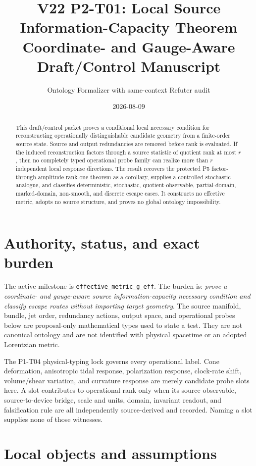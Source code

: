 \documentclass[11pt]{article}
\title{V22 P2-T01: Local Source Information-Capacity Theorem\\
\large Coordinate- and Gauge-Aware Draft/Control Manuscript}
\author{Ontology Formalizer with same-context Refuter audit}
\date{2026-08-09}
\begin{document}
\maketitle

\begin{abstract}
This draft/control packet proves a conditional local necessary condition for
reconstructing operationally distinguishable candidate geometry from a
finite-order source state.  Source and output redundancies are removed before
rank is evaluated.  If the induced reconstruction factors through a source
statistic of quotient rank at most \(r\), then no completely typed operational
probe family can realize more than \(r\) independent local response directions.
The result recovers the protected P5 factor-through-amplitude rank-one theorem
as a corollary, supplies a controlled stochastic analogue, and classifies
deterministic, stochastic, quotient-observable, partial-domain, marked-domain,
non-smooth, and discrete escape cases.  It constructs no effective metric,
adopts no source structure, and proves no global ontology impossibility.
\end{abstract}

\section{Authority, status, and exact burden}

The active milestone is \texttt{effective\_metric\_g\_eff}.  The burden is:
\emph{prove a coordinate- and gauge-aware source information-capacity necessary
condition and classify escape routes without importing target geometry}.
The source manifold, bundle, jet order, redundancy actions, output space, and
operational probes below are proposal-only mathematical types used to state a
test.  They are not canonical ontology and are not identified with physical
spacetime or an adopted Lorentzian metric.

The P1-T04 physical-typing lock governs every operational label.  Cone
deformation, anisotropic tidal response, polarization response, clock-rate
shift, volume/shear variation, and curvature response are merely candidate
probe slots here.  A slot contributes to operational rank only when its source
observable, source-to-device bridge, scale and units, domain, invariant
readout, and falsification rule are all independently source-derived and
recorded.  Naming a slot supplies none of those witnesses.

\section{Local objects and assumptions}
\end{document}
